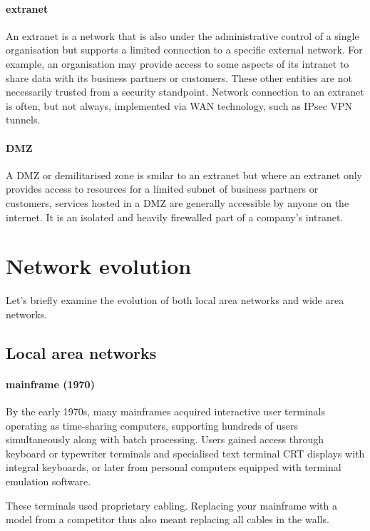 {\paragraph{extranet}
An extranet is a network that is also under the administrative control of a single organisation but supports a limited connection to a specific external network.
For example, an organisation may provide access to some aspects of its intranet to share data with its business partners or customers.
These other entities are not necessarily trusted from a security standpoint.
Network connection to an extranet is often, but not always, implemented via WAN technology, such as IPsec VPN tunnels.

\paragraph{DMZ}
A DMZ or demilitarised zone is smilar to an extranet but where an extranet only provides access to resources for a limited subnet of business partners or customers, services hosted in a DMZ are generally accessible by anyone on the internet.
It is an isolated and heavily firewalled part of a company's intranet.

\section{Network evolution}
\label{sec:network-evolution}

Let's briefly examine the evolution of both local area networks and wide area networks.

\subsection{Local area networks}
\label{sec:network-evolution-lan}

\paragraph{mainframe (1970)}
By the early 1970s, many mainframes acquired interactive user terminals operating as time-sharing computers, supporting hundreds of users simultaneously along with batch processing.
Users gained access through keyboard or typewriter terminals and specialised text terminal CRT displays with integral keyboards, or later from personal computers equipped with terminal emulation software.

These terminals used proprietary cabling.
Replacing your mainframe with a model from a competitor thus also meant replacing all cables in the walls.
    
}
